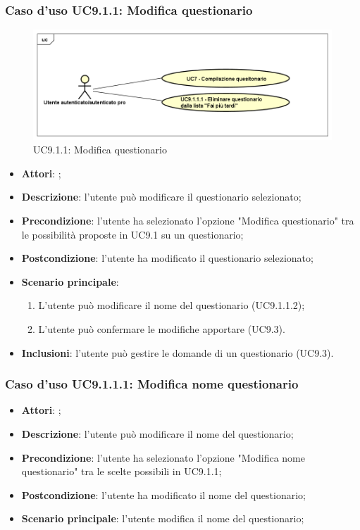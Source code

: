 			\subsubsection{Caso d'uso UC9.1.1: Modifica questionario}
			\label{UC9.1.1}
			\begin{figure}[h]
				\centering
			\includegraphics[scale=0.5,keepaspectratio]{UML/UC9_1_1.png}
				\caption{UC9.1.1: Modifica questionario}
			\end{figure}
			\FloatBarrier
			\begin{itemize}
				\item \textbf{Attori}: \uaupro;
				\item \textbf{Descrizione}: l'utente può modificare il questionario selezionato;
				\item \textbf{Precondizione}: l'utente ha selezionato l'opzione "Modifica questionario" tra le possibilità proposte in UC9.1 su un questionario;
				\item \textbf{Postcondizione}: l'utente ha modificato il questionario selezionato; 
				\item \textbf{Scenario principale}:
					\begin{enumerate}
						\item L'utente può modificare il nome del questionario (UC9.1.1.2);
						\item L'utente può confermare le modifiche apportare (UC9.3).
					\end{enumerate}
				\item \textbf{Inclusioni}: l'utente può gestire le domande di un questionario (UC9.3).
			\end{itemize}
								
					\subsubsection{Caso d'uso UC9.1.1.1: Modifica nome questionario}
					\label{UC9.1.1.1}
					\begin{itemize}
						\item \textbf{Attori}: \uaupro;
						\item \textbf{Descrizione}: l'utente può modificare il nome del questionario; 
						\item \textbf{Precondizione}: l'utente ha selezionato l'opzione "Modifica nome questionario" tra le scelte possibili in UC9.1.1;
						\item \textbf{Postcondizione}: l'utente ha modificato il nome del questionario; 
						\item \textbf{Scenario principale}: l'utente modifica il nome del questionario;
					\end{itemize}
																					
